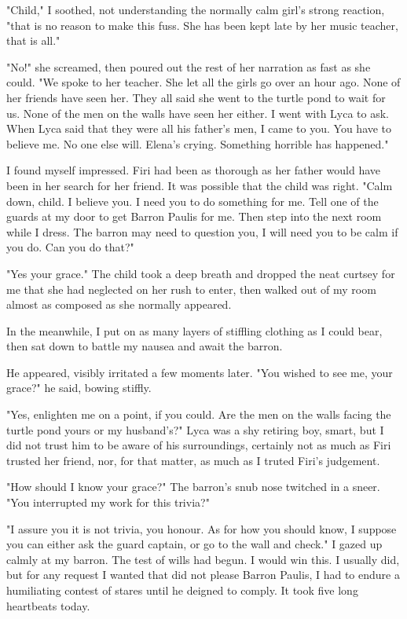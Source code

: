 \documentclass{article}
\begin{document}
"Child," I soothed, not understanding the normally calm girl's strong reaction, "that is no reason to make this fuss. She has been kept late by her music teacher, that is all."

"No!" she screamed, then poured out the rest of her narration as fast as she could. "We spoke to her teacher. She let all the girls go over an hour ago. None of her friends have seen her. They all said she went to the turtle pond to wait for us. None of the men on the walls have seen her either. I went with Lyca to ask. When Lyca said that they were all his father's men, I came to you. You have to believe me. No one else will. Elena's crying. Something horrible has happened."

I found myself impressed. Firi had been as thorough as her father would have been in her search for her friend. It was possible that the child was right. "Calm down, child. I believe you. I need you to do something for me. Tell one of the guards at my door to get Barron Paulis for me. Then step into the next room while I dress. The barron may need to question you, I will need you to be calm if you do. Can you do that?"

"Yes your grace." The child took a deep breath and dropped the neat curtsey for me that she had neglected on her rush to enter, then walked out of my room almost as composed as she normally appeared.

In the meanwhile, I put on as many layers of stiffling clothing as I could bear, then sat down to battle my nausea and await the barron.

He appeared, visibly irritated a few moments later. "You wished to see me, your grace?" he said, bowing stiffly. 

"Yes, enlighten me on a point, if you could. Are the men on the walls facing the turtle pond yours or my husband's?" Lyca was a shy retiring boy, smart, but I did not trust him to be aware of his surroundings, certainly not as much as Firi trusted her friend, nor, for that matter, as much as I truted Firi's judgement. 

"How should I know your grace?" The barron's snub nose twitched in a sneer. "You interrupted my work for this trivia?"

"I assure you it is not trivia, you honour. As for how you should know, I suppose you can either ask the guard captain, or go to the wall and check." I gazed up calmly at my barron. The test of wills had begun. I would win this. I usually did, but for any request I wanted that did not please Barron Paulis, I had to endure a humiliating contest of stares until he deigned to comply. It took five long heartbeats today.
\end{document}
